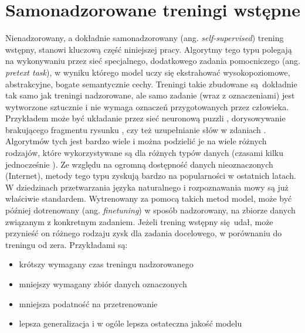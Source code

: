 \section{Samonadzorowane treningi wstępne}

Nienadzorowany, a dokładnie samonadzorowany (ang. \emph{self-supervised}) trening wstępny, stanowi
kluczową część niniejszej pracy. Algorytmy tego typu polegają na wykonywaniu przez sieć specjalnego,
dodatkowego zadania pomocniczego (ang. \emph{pretext task}), w wyniku którego model uczy się
ekstrahować wysokopoziomowe, abstrakcyjne, bogate semantycznie cechy. Treningi takie zbudowane
są dokładnie tak samo jak treningi nadzorowane, ale samo zadanie (wraz z oznaczeniami) jest
wytworzone sztucznie i nie wymaga oznaczeń przygotowanych przez człowieka. Przykładem może być
układanie przez sieć neuronową puzzli \cite{noroozi_unsupervised_2017}, dorysowywanie brakującego
fragmentu rysunku \cite{pathak_context_2016}, czy też uzupełnianie słów w zdaniach
\cite{devlin_bert_2019}. Algorytmów tych jest bardzo wiele i można podzielić je na wiele różnych
rodzajów, które wykorzystywane są dla różnych typów danych (czasami kilku jednocześnie
\cite{jia_scaling_2021}). Ze względu na ogromną dostępność danych nieoznaczonych (Internet), metody
tego typu zyskują bardzo na popularności w ostatnich latach. W dziedzinach przetwarzania języka
naturalnego i rozpoznawania mowy są już właściwie standardem. Wytrenowany za pomocą takich metod
model, może być później dotrenowany (ang. \emph{finetuning}) w sposób nadzorowany, na zbiorze
danych związanym z konkretnym zadaniem. Jeżeli trening wstępny się udał, może przynieść on różnego
rodzaju zysk dla zadania docelowego, w porównaniu do treningu od zera. Przykładami są:
\begin{itemize}
    \item krótszy wymagany czas treningu nadzorowanego
    \item mniejszy wymagany zbiór danych oznaczonych
    \item mniejsza podatność na przetrenowanie
    \item lepsza generalizacja i w ogóle lepsza ostateczna jakość modelu
\end{itemize}

